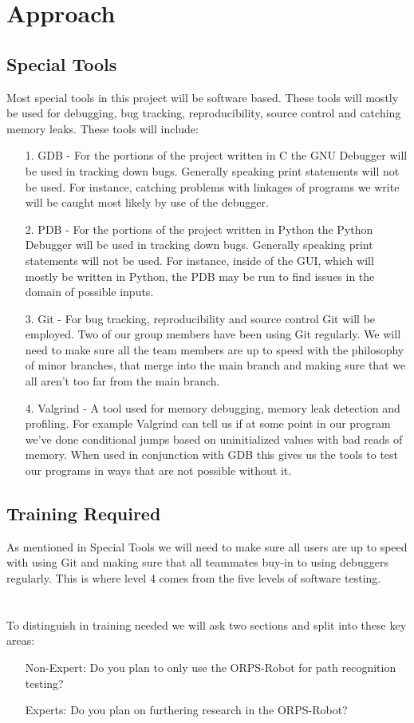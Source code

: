 \documentclass[english,12pt]{article}
\begin{document}
\section{Approach}
\subsection{Special Tools}
Most special tools in this project will be software based. These tools will mostly be used for 
debugging, bug tracking, reproducibility, source control and catching memory leaks. These tools will include:\\
\begin{itemize}
    \item[1. ] GDB - For the portions of the project written in C the GNU Debugger will be used 
    in tracking down bugs. Generally speaking print statements will not be used. For instance, 
    catching problems with linkages of programs we write will be caught most likely by use of the debugger.
    \item[2. ] PDB - For the portions of the project written in Python the Python Debugger will be used 
    in tracking down bugs. Generally speaking print statements will not be used.
    For instance, inside of the GUI, which will mostly be written in Python, the PDB may be run 
    to find issues in the domain of possible inputs. 
    \item[3. ] Git - For bug tracking, reproducibility and source control Git will be employed.
    Two of our group members have been using Git regularly. We will need to make sure all the team 
    members are up to speed with the philosophy of minor branches, that merge into the main branch and 
    making sure that we all aren't too far from the main branch. 
    \item[4. ] Valgrind - A tool used for memory debugging, memory leak detection and profiling.
     For example Valgrind can tell us if at some point in our program we've done conditional 
     jumps based on uninitialized values with bad reads of memory. When used in conjunction 
     with GDB this gives us the tools to test our programs in ways that are not possible 
     without it.
\end{itemize}
\subsection{Training Required}
As mentioned in Special Tools we will need to make sure all users are up to speed with using Git
and making sure that all teammates buy-in to using debuggers regularly. This is where level 4 comes 
from the five levels of software testing. \\\\\\
To distinguish in training needed we will ask two sections and split into these key areas:\\
\begin{itemize}
    \item[Non-Expert:] Do you plan to only use the ORPS-Robot for path recognition testing?
    \item[Experts:] Do you plan on furthering research in the ORPS-Robot?
\end{itemize}
\end{document}
